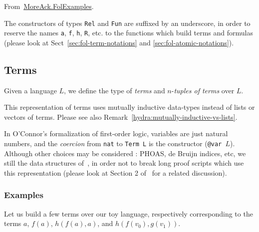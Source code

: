 From~\href{../theories/html/hydras.MoreAck.FolExamples.html}{MoreAck.FolExamples}.


\begin{remark}
  \label{rem:underscores}
  The constructors of types \texttt{Rel} and \texttt{Fun} are suffixed by an underscore, in order to reserve the names \texttt{a}, \texttt{f}, \texttt{h}, \texttt{R}, etc. to the functions which build terms and formulas (please look at Sect~\ref{sec:fol-term-notations} and \ref{sec:fol-atomic-notations}).
\end{remark}


\subsection{Terms}

Given a language $L$, we define the type of \emph{terms} and
$n$-\emph{tuples of terms} over $L$.


\begin{remark}
This representation of terms uses mutually inductive data-types instead of lists or vectors of terms. Please see also Remark~\ref{hydra:mutually-inductive-vs-lists}.
\end{remark}


\begin{remark}[Variables]
In O'Connor's formalization of first-order logic,  variables are 
just natural numbers, and the \emph{coercion} from
\texttt{nat} to \texttt{Term L} is the constructor (\texttt{@var $L$}).
Although other choices may be considered : PHOAS, de Bruijn indices, etc,  we still the data structures of~\cite{Goedel}, in order not to break long proof scripts which use this representation (please look at Section 2 of~\cite{OConnor05} for a related discussion).
  
\end{remark}




\subsubsection{Examples}
\label{sect:folTermExamples}
\label{sec:fol-term-notations}

Let us build a few \gallina terms over our toy language, 
respectively corresponding to the terms $a$,
$f(a)$, $h(f(a),a)$, and $h(f(v_0),g(v_1))$.

